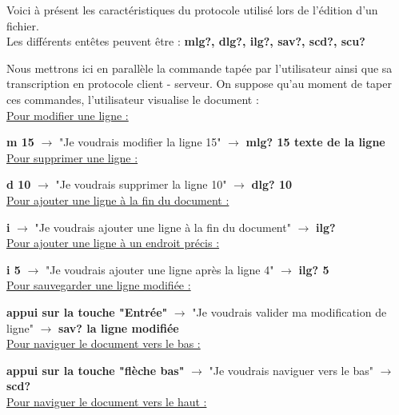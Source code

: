 \documentclass[12pt]{article}
\begin{document}
Voici à présent les caractéristiques du protocole utilisé lors de l'édition d'un fichier. \\

Les différents entêtes peuvent être : \textbf{mlg?, dlg?, ilg?, sav?, scd?, scu?}

Nous mettrons ici en parallèle la commande tapée par l'utilisateur ainsi que sa transcription en protocole client - serveur. On suppose qu'au moment de taper ces commandes, l'utilisateur visualise le document :\\

\underline{Pour modifier une ligne : \\}

\textbf{m 15} $\rightarrow$ "Je voudrais modifier la ligne 15" $\rightarrow$ \textbf{mlg? 15 texte de la ligne}\\

\underline{Pour supprimer une ligne : \\}

\textbf{d 10} $\rightarrow$ "Je voudrais supprimer la ligne 10" $\rightarrow$ \textbf{dlg? 10}\\

\underline{Pour ajouter une ligne à la fin du document : \\}

\textbf{i} $\rightarrow$ "Je voudrais ajouter une ligne à la fin du document" $\rightarrow$ \textbf{ilg?}\\

\underline{Pour ajouter une ligne à un endroit précis :\\}

\textbf{i 5} $\rightarrow$ "Je voudrais ajouter une ligne après la ligne 4" $\rightarrow$ \textbf{ilg? 5}\\

\underline{Pour sauvegarder une ligne modifiée :\\}

\textbf{appui sur la touche "Entrée"} $\rightarrow$ "Je voudrais valider ma modification de ligne" $\rightarrow$ \textbf{sav? la ligne modifiée}\\

\underline{Pour naviguer le document vers le bas :\\}

\textbf{appui sur la touche "flèche bas"} $\rightarrow$ "Je voudrais naviguer vers le bas" $\rightarrow$ \textbf{scd?}\\

\underline{Pour naviguer le document vers le haut :\\}
\end{document}
